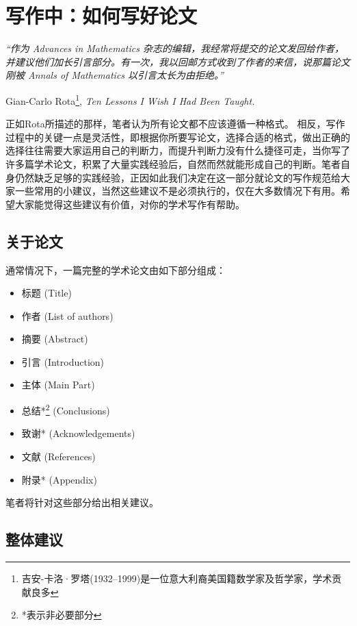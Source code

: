 \documentclass{formatBook}
\begin{document}
\section{写作中：如何写好论文}
\noindent \textit{“作为 Advances in Mathematics 杂志的编辑，我经常将提交的论文发回给作者，并建议他们加长引言部分。有一次，我以回邮方式收到了作者的来信，说那篇论文刚被 Annals of Mathematics 以引言太长为由拒绝。”}
\begin{flushright}
    \cndash Gian-Carlo Rota\footnote{吉安-卡洛·罗塔(1932–1999)是一位意大利裔美国籍数学家及哲学家，学术贡献良多}, \textit{Ten Lessons I Wish I Had Been Taught\cite{rota_ten_1997}.}
\end{flushright}
正如Rota所描述的那样，笔者认为所有论文都不应该遵循一种格式。 相反，写作过程中的关键一点是灵活性，即根据你所要写论文，选择合适的格式，做出正确的选择往往需要大家运用自己的判断力，而提升判断力没有什么捷径可走，当你写了许多篇学术论文，积累了大量实践经验后，自然而然就能形成自己的判断。笔者自身仍然缺乏足够的实践经验，正因如此我们决定在这一部分就论文的写作规范给大家一些常用的小建议，当然这些建议不是必须执行的，仅在大多数情况下有用。希望大家能觉得这些建议有价值，对你的学术写作有帮助。
\subsection{关于论文}
通常情况下，一篇完整的学术论文由如下部分组成：
\begin{itemize}
    \item 标题 (Title)
    \item 作者 (List of authors)
    \item 摘要 (Abstract)
    \item 引言 (Introduction)
    \item 主体 (Main Part)
    \item 总结*\footnote{*表示非必要部分} (Conclusions)
    \item 致谢* (Acknowledgements)
    \item 文献 (References)
    \item 附录* (Appendix)
\end{itemize}
\par
笔者将针对这些部分给出相关建议。
\subsection{整体建议}
\end{document}
